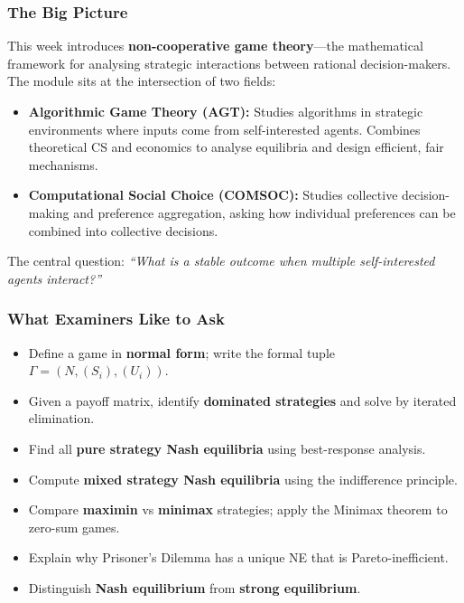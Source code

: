 \separator

\subsubsection*{The Big Picture}

This week introduces \textbf{non-cooperative game theory}---the mathematical framework for analysing strategic interactions between rational decision-makers. The module sits at the intersection of two fields:

\begin{itemize}
  \item \textbf{Algorithmic Game Theory (AGT):} Studies algorithms in strategic environments where inputs come from self-interested agents. Combines theoretical CS and economics to analyse equilibria and design efficient, fair mechanisms.
  \item \textbf{Computational Social Choice (COMSOC):} Studies collective decision-making and preference aggregation, asking how individual preferences can be combined into collective decisions.
\end{itemize}

The central question: \textit{``What is a stable outcome when multiple self-interested agents interact?''}

\separator

\subsubsection*{What Examiners Like to Ask}

\begin{itemize}
  \item Define a game in \textbf{normal form}; write the formal tuple $\Gamma = (N, (S_i), (U_i))$.
  \item Given a payoff matrix, identify \textbf{dominated strategies} and solve by iterated elimination.
  \item Find all \textbf{pure strategy Nash equilibria} using best-response analysis.
  \item Compute \textbf{mixed strategy Nash equilibria} using the indifference principle.
  \item Compare \textbf{maximin} vs \textbf{minimax} strategies; apply the Minimax theorem to zero-sum games.
  \item Explain why Prisoner's Dilemma has a unique NE that is Pareto-inefficient.
  \item Distinguish \textbf{Nash equilibrium} from \textbf{strong equilibrium}.
\end{itemize}


